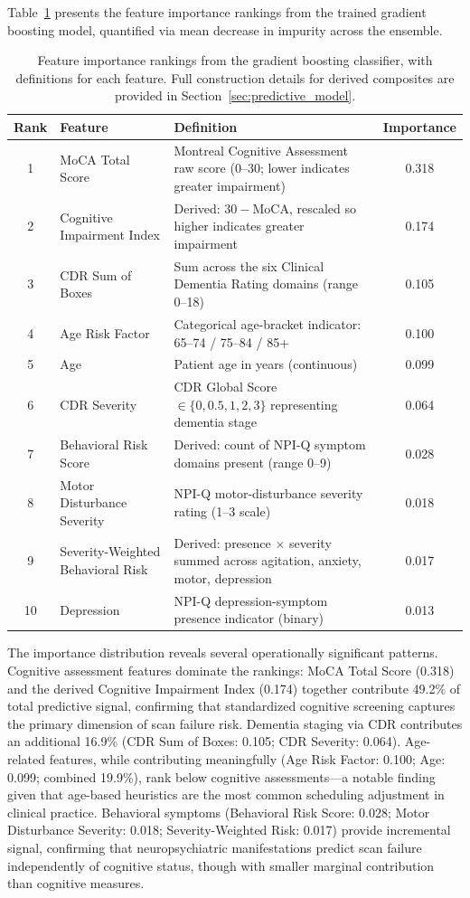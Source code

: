 \documentclass[11pt,a4paper]{article}
\begin{document}
Table~\ref{tab:feature_importance} presents the feature importance rankings from the trained gradient boosting model, quantified via mean decrease in impurity across the ensemble.

\begin{table}[htbp]
\centering
\caption{Feature importance rankings from the gradient boosting classifier, with definitions for each feature. Full construction details for derived composites are provided in Section~\ref{sec:predictive_model}.}
\label{tab:feature_importance}
\begin{tabular}{@{}clp{7.2cm}c@{}}
\toprule
\textbf{Rank} & \textbf{Feature} & \textbf{Definition} & \textbf{Importance} \\
\midrule
1 & MoCA Total Score & Montreal Cognitive Assessment raw score (0--30; lower indicates greater impairment) & 0.318 \\
2 & Cognitive Impairment Index & Derived: $30 - \text{MoCA}$, rescaled so higher indicates greater impairment & 0.174 \\
3 & CDR Sum of Boxes & Sum across the six Clinical Dementia Rating domains (range 0--18) & 0.105 \\
4 & Age Risk Factor & Categorical age-bracket indicator: 65--74 / 75--84 / 85+ & 0.100 \\
5 & Age & Patient age in years (continuous) & 0.099 \\
6 & CDR Severity & CDR Global Score $\in \{0, 0.5, 1, 2, 3\}$ representing dementia stage & 0.064 \\
7 & Behavioral Risk Score & Derived: count of NPI-Q symptom domains present (range 0--9) & 0.028 \\
8 & Motor Disturbance Severity & NPI-Q motor-disturbance severity rating (1--3 scale) & 0.018 \\
9 & Severity-Weighted Behavioral Risk & Derived: presence $\times$ severity summed across agitation, anxiety, motor, depression & 0.017 \\
10 & Depression & NPI-Q depression-symptom presence indicator (binary) & 0.013 \\
\bottomrule
\end{tabular}
\end{table}

The importance distribution reveals several operationally significant patterns. Cognitive assessment features dominate the rankings: MoCA Total Score (0.318) and the derived Cognitive Impairment Index (0.174) together contribute 49.2\% of total predictive signal, confirming that standardized cognitive screening captures the primary dimension of scan failure risk. Dementia staging via CDR contributes an additional 16.9\% (CDR Sum of Boxes: 0.105; CDR Severity: 0.064). Age-related features, while contributing meaningfully (Age Risk Factor: 0.100; Age: 0.099; combined 19.9\%), rank below cognitive assessments---a notable finding given that age-based heuristics are the most common scheduling adjustment in clinical practice. Behavioral symptoms (Behavioral Risk Score: 0.028; Motor Disturbance Severity: 0.018; Severity-Weighted Risk: 0.017) provide incremental signal, confirming that neuropsychiatric manifestations predict scan failure independently of cognitive status, though with smaller marginal contribution than cognitive measures.
\end{document}
